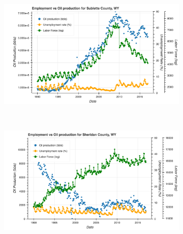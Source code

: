 \documentclass[11pt,letterpaper]{article}
\begin{document}
\begin{figure}
\begin{subfigure}{0.45\textwidth}
\includegraphics[width=1.1\linewidth]{wy_sublette_oil_prod}
\end{subfigure}
~
\begin{subfigure}{0.45\textwidth}
\includegraphics[width=1.1\linewidth]{wy_sheridan_oil_prod}
\end{subfigure}


\end{figure}
\end{document}
